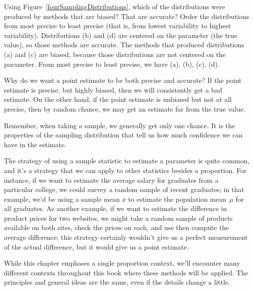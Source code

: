 
\begin{examplewrap}
\begin{nexample}
{Using Figure~\ref{fourSamplingDistributions}, which of the distributions were produced by methods that are biased?  That are accurate?  Order the distributions from most precise to least precise (that is, from lowest variability to highest variability).}
Distributions (b) and (d) are centered on the parameter (the true value), so those methods are accurate.  The methods that produced distributions (a) and (c) are biased, because those distributions are not centered on the parameter.  From most precise to least precise, we have (a), (b), (c), (d).
\end{nexample}
\end{examplewrap}

\begin{examplewrap}
\begin{nexample}
{Why do we want a point estimate to be both precise and accurate?} If the point estimate is precise, but highly biased, then we will consistently get a bad estimate.  On the other hand, if the point estimate is unbiased but not at all precise, then by random chance, we may get an estimate far from the true value.  

Remember, when taking a sample, we generally get only one chance.  It is the properties of the sampling distribution that tell us how much confidence we can have in the estimate. \end{nexample}
\end{examplewrap}

The strategy of using a sample statistic to estimate
a parameter is quite common, and it's a strategy that
we can apply to other statistics besides a proportion.
For instance, if we want to estimate the average salary
for graduates from a particular college, we could
survey a random sample of recent graduates;
in that example, we'd be using a sample mean $\bar{x}$
to estimate the population mean~$\mu$ for all graduates.
As another example, if we want to estimate the
difference in product prices for two websites,
we might take a random sample of products available
on both sites, check the prices on each,
and use then compute the average difference;
this strategy certainly wouldn't give us a perfect
measurement of the actual difference, but it would
give us a point estimate.

While this chapter emphases a single proportion
context, we'll encounter many different contexts
throughout this book where these methods will be
applied.
The principles and general ideas are the same,
even if the details change a little.



